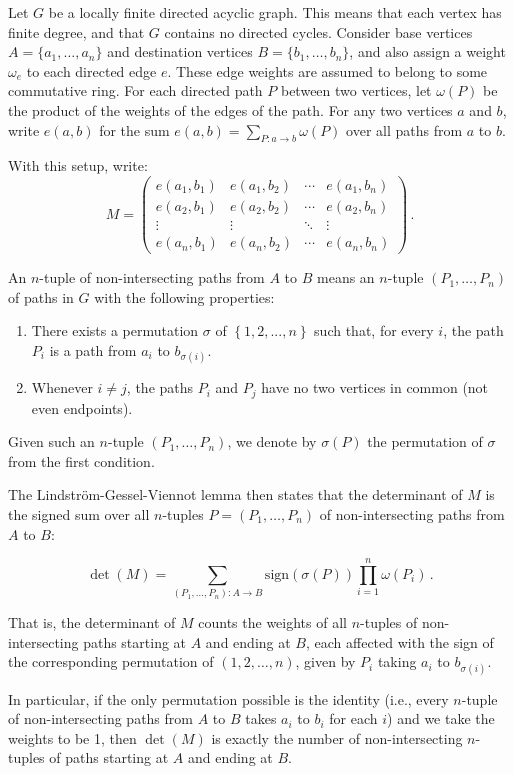 Let $G$ be a locally finite directed acyclic graph. This means that each vertex has finite degree, and that $G$ contains no directed cycles. Consider base vertices $A = \{ a_1, \ldots, a_n \}$ and destination vertices $B = \{ b_1, \ldots, b_n \}$, and also assign a weight $\omega_{e}$ to each directed edge $e$. These edge weights are assumed to belong to some commutative ring. For each directed path $P$ between two vertices, let $ \omega(P) $ be the product of the weights of the edges of the path. For any two vertices $a$ and $b$, write $e(a,b)$ for the sum $e(a,b) = \sum_{P: a \to b} \omega(P)$ over all paths from $a$ to $b$.

With this setup, write:
$$M = \begin{pmatrix} e(a_1,b_1) & e(a_1,b_2) & \cdots & e(a_1,b_n) \\ e(a_2,b_1) & e(a_2,b_2) & \cdots & e(a_2,b_n) \\ \vdots & \vdots & \ddots & \vdots \\ e(a_n,b_1) & e(a_n,b_2) & \cdots & e(a_n,b_n) \end{pmatrix}\,.$$

An $n$-tuple of non-intersecting paths from $A$ to $B$ means an $n$-tuple $(P_1, \ldots, P_n)$ of paths in $G$ with the following properties:

\begin{enumerate}
\item There exists a permutation $\sigma$ of $\left\{ 1, 2, ..., n \right\}$ such that, for every $i$, the path $P_i$ is a path from $a_i$ to $b_{\sigma(i)}$.
\item Whenever $i \neq j$, the paths $P_i$ and $P_j$ have no two vertices in common (not even endpoints).
\end{enumerate}

Given such an $n$-tuple $(P_1, \ldots, P_n)$, we denote by $\sigma(P)$ the permutation of $\sigma$ from the first condition.

The Lindström-Gessel-Viennot lemma then states that the determinant of $M$ is the signed sum over all $n$-tuples $P = (P_1, \ldots, P_n)$ of non-intersecting paths from $A$ to $B$:

$$\det(M) = \sum_{(P_1,\ldots,P_n) \colon A \to B} \mathrm{sign}(\sigma(P)) \prod_{i=1}^n \omega(P_i)\,.$$

That is, the determinant of $M$ counts the weights of all $n$-tuples of non-intersecting paths starting at $A$ and ending at $B$, each affected with the sign of the corresponding permutation of $(1,2,\ldots,n)$, given by $ P_i $ taking $ a_i $ to $ b_{\sigma(i)} $.

In particular, if the only permutation possible is the identity (i.e., every $n$-tuple of non-intersecting paths from $A$ to $B$ takes $a_i$ to $b_i$ for each $i$) and we take the weights to be 1, then $\det(M)$ is exactly the number of non-intersecting $n$-tuples of paths starting at $A$ and ending at $B$.
